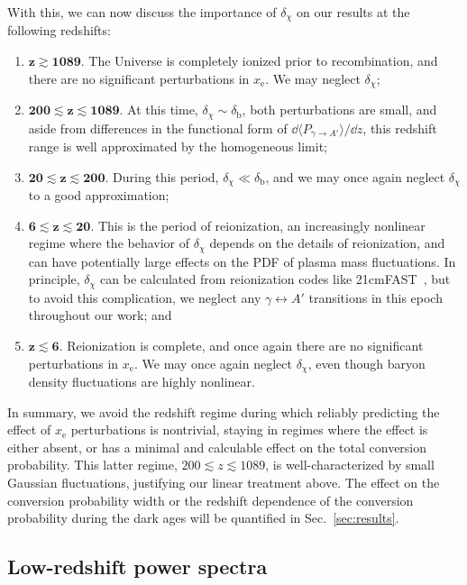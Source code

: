 \documentclass[prd,aps,10pt,nofootinbib,twocolumn,superscriptaddress,preprintnumbers,balancelastpage,longbibliography]{revtex4-1}
\begin{document}
With this, we can now discuss the importance of $\delta_\chi$ on our results at the following redshifts: 
\begin{enumerate}
    \item $\mathbf{\boldsymbol{z} \gtrsim 1089}$. The Universe is completely ionized prior to recombination, and there are no significant perturbations in $x_\text{e}$. We may neglect $\delta_\chi$; 
    \item $\mathbf{200 \lesssim \boldsymbol{z} \lesssim 1089}$. At this time, $\delta_\chi \sim \delta_\text{b}$, both perturbations are small, and aside from differences in the functional form of $\dd \langle P_{\gamma \to A'} \rangle/\dd z$, this redshift range is well approximated by the homogeneous limit; 
    \item $\mathbf{20 \lesssim \boldsymbol{z} \lesssim 200}$. During this period, $\delta_\chi \ll \delta_\text{b}$, and we may once again neglect $\delta_\chi$ to a good approximation; 
    \item $\mathbf{6 \lesssim \boldsymbol{z} \lesssim 20}$. This is the period of reionization, an increasingly nonlinear regime where the behavior of $\delta_\chi$ depends on the details of reionization, and can have potentially large effects on the PDF of plasma mass fluctuations.
    In principle, $\delta_\chi$ can be calculated from reionization codes like 21cmFAST~\cite{Mesinger:2010ne, Munoz:2019rhi}, but to avoid this complication, we neglect any $\gamma \leftrightarrow A'$ transitions in this epoch throughout our work; and
    \item $\mathbf{\boldsymbol{z} \lesssim 6}$. Reionization is complete, and once again there are no significant perturbations in $x_\text{e}$. We may once again neglect $\delta_\chi$, even though baryon density fluctuations are highly nonlinear. 
\end{enumerate}
In summary, we avoid the redshift regime during which reliably predicting the effect of $x_\text{e}$ perturbations is nontrivial, staying in regimes where the effect is either absent, or has a minimal and calculable effect on the total conversion probability.
This latter regime, $200 \lesssim z \lesssim 1089$, is well-characterized by small Gaussian fluctuations, justifying our linear treatment above.
The effect on the conversion probability width or the redshift dependence of the conversion probability during the dark ages will be quantified in Sec.~\ref{sec:results}.

\subsection{Low-redshift power spectra}
\label{sec:power_spectra}
\end{document}
